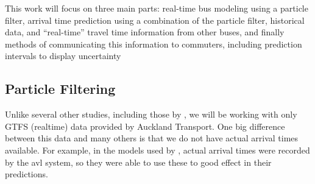 \documentclass[12pt,a4paper]{article}
\begin{document}


















This work will focus on three main parts:
real-time bus modeling using a particle filter,
arrival time prediction using a combination of the particle filter,
historical data, and ``real-time'' travel time information
from other buses,
and finally methods of communicating this information to commuters,
including prediction intervals
to display uncertainty


\subsection{Particle Filtering}
\label{sec:new-pf}

Unlike several other studies, including those by \cite{hans-etal:2015},
we will be working with only GTFS (realtime) data provided by Auckland Transport.
One big difference between this data and many others is that we do not have
actual arrival times available.
For example, in the models used by \cite{hans-etal:2015},
actual arrival times were recorded by the \gls{avl} system, 
so they were able to use these to good effect in their predictions.
\end{document}
